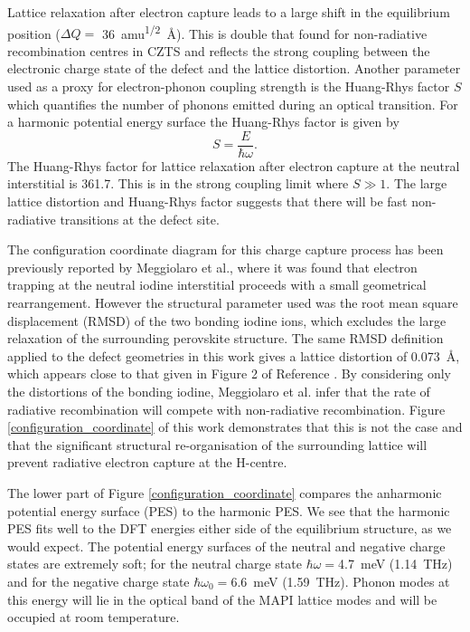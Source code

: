 Lattice relaxation after electron capture leads to a large shift in the equilibrium position ($\Delta Q=$ \SI{36}{amu\tothe{1/2}\angstrom}).
This is double that found for non-radiative recombination centres in CZTS\autocite{Kim2018} and reflects the strong coupling between the electronic charge state of the defect and the lattice distortion. 
Another parameter used as a proxy for electron-phonon coupling strength is the Huang-Rhys factor $S$ which quantifies the number of phonons emitted during an optical transition. For a harmonic potential energy surface the Huang-Rhys factor is given by 
\begin{equation}
S = \frac{E}{\hbar\omega}.
\end{equation}
The Huang-Rhys factor for lattice relaxation after electron capture at the neutral interstitial is 361.7. This is in the strong coupling limit where $S\gg1$. The large lattice distortion and Huang-Rhys factor suggests that there will be fast non-radiative transitions at the defect site.\autocite{Hayes1985,Hughes1967}

The configuration coordinate diagram for this charge capture process has been previously reported by Meggiolaro et al.,\autocite{Meggiolaro2018} where it was found that electron trapping at the neutral iodine interstitial proceeds with a small geometrical rearrangement. However the structural parameter used was the root mean square displacement (RMSD) of the two bonding iodine ions, which excludes the large relaxation of the surrounding perovskite structure. The same RMSD definition applied to the defect geometries in this work gives a lattice distortion of \SI{0.073}{\angstrom}, which appears close to that given in Figure 2 of Reference \cite{Meggiolaro2018}. By considering only the distortions of the bonding iodine, Meggiolaro et al. infer that the rate of radiative recombination will compete with non-radiative recombination. Figure \ref{configuration_coordinate} of this work demonstrates that this is not the case and that the significant structural re-organisation of the surrounding lattice will prevent radiative electron capture at the H-centre.

The lower part of Figure \ref{configuration_coordinate} compares the anharmonic potential energy surface (PES) to the harmonic PES. We see that the harmonic PES fits well to the DFT energies either side of the equilibrium structure, as we would expect. The potential energy surfaces of the neutral and negative charge states are extremely soft; for the neutral charge state $\hbar\omega=$\SI{4.7}{meV} (\SI{1.14}{\tera\hertz}) and for the negative charge state $\hbar\omega_0=$\SI{6.6}{meV} (\SI{1.59}{\tera\hertz}). Phonon modes at this energy will lie in the optical band of the MAPI lattice modes and will be occupied at room temperature.

